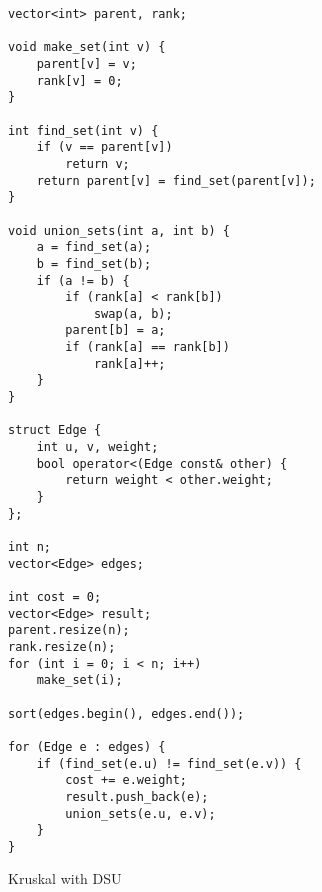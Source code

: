 \documentclass{article}
\begin{document}
\begin{lstlisting}
vector<int> parent, rank;

void make_set(int v) {
    parent[v] = v;
    rank[v] = 0;
}

int find_set(int v) {
    if (v == parent[v])
        return v;
    return parent[v] = find_set(parent[v]);
}

void union_sets(int a, int b) {
    a = find_set(a);
    b = find_set(b);
    if (a != b) {
        if (rank[a] < rank[b])
            swap(a, b);
        parent[b] = a;
        if (rank[a] == rank[b])
            rank[a]++;
    }
}

struct Edge {
    int u, v, weight;
    bool operator<(Edge const& other) {
        return weight < other.weight;
    }
};

int n;
vector<Edge> edges;

int cost = 0;
vector<Edge> result;
parent.resize(n);
rank.resize(n);
for (int i = 0; i < n; i++)
    make_set(i);

sort(edges.begin(), edges.end());

for (Edge e : edges) {
    if (find_set(e.u) != find_set(e.v)) {
        cost += e.weight;
        result.push_back(e);
        union_sets(e.u, e.v);
    }
}
\end{lstlisting}
Kruskal with DSU
\end{document}
